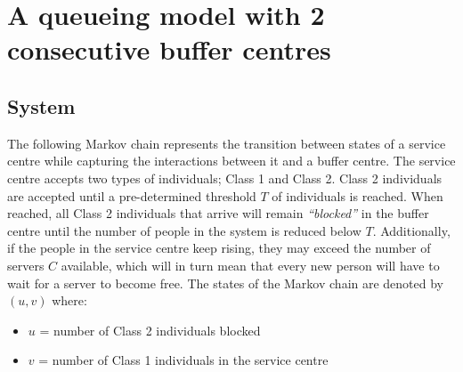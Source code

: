 \section{A queueing model with 2 consecutive buffer centres}

\subsection{System}
The following Markov chain represents the transition between states of a service
centre 
while capturing the interactions between it and a buffer centre.
The service centre accepts two types of individuals; Class 1 and Class 2.  
Class 2 individuals are accepted until a pre-determined threshold \(T\) of 
individuals is reached.
When reached, all Class 2 individuals that arrive will remain \textit{``blocked''}
in the buffer centre until the number of people in the system is 
reduced below \(T\). 
Additionally, if the people in the service centre keep rising, they may exceed
the number 
of servers \(C\) available, which will in turn mean that every new person will 
have to wait for a server to become free. 
The states of the Markov chain are denoted by \((u,v)\) where:

\begin{itemize}
    \item \(u\) = number of Class 2 individuals blocked
    \item \(v\) = number of Class 1 individuals in the service centre
\end{itemize}

